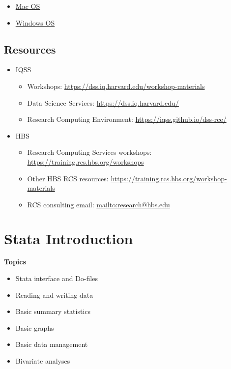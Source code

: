 \documentclass[
]{book}
\providecommand{\tightlist}{%
  \setlength{\itemsep}{0pt}\setlength{\parskip}{0pt}}
\begin{document}
\begin{itemize}
\tightlist
\item
  \href{https://support.apple.com/guide/mac-help/show-or-hide-filename-extensions-on-mac-mchlp2304/mac}{Mac OS}
\item
  \href{http://kb.winzip.com/kb/entry/26/}{Windows OS}
\end{itemize}

\hypertarget{resources-9}{%
\section{Resources}\label{resources-9}}

\begin{itemize}
\tightlist
\item
  IQSS

  \begin{itemize}
  \tightlist
  \item
    Workshops: \url{https://dss.iq.harvard.edu/workshop-materials}
  \item
    Data Science Services: \url{https://dss.iq.harvard.edu/}
  \item
    Research Computing Environment: \url{https://iqss.github.io/dss-rce/}
  \end{itemize}
\item
  HBS

  \begin{itemize}
  \tightlist
  \item
    Research Computing Services workshops: \url{https://training.rcs.hbs.org/workshops}
  \item
    Other HBS RCS resources: \url{https://training.rcs.hbs.org/workshop-materials}
  \item
    RCS consulting email: \url{mailto:research@hbs.edu}
  \end{itemize}
\end{itemize}

\hypertarget{stata-introduction}{%
\chapter{Stata Introduction}\label{stata-introduction}}

\textbf{Topics}

\begin{itemize}
\tightlist
\item
  Stata interface and Do-files
\item
  Reading and writing data
\item
  Basic summary statistics
\item
  Basic graphs
\item
  Basic data management
\item
  Bivariate analyses
\end{itemize}
\end{document}
